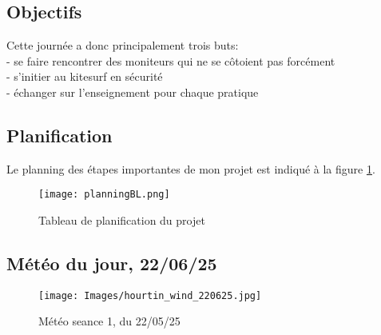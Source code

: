 \documentclass[12pt,a4paper]{report}
\begin{document}
\subsection{Objectifs}
Cette journée a donc principalement trois buts:\\
- se faire rencontrer des moniteurs qui ne se côtoient pas forcément \\
- s'initier au kitesurf en sécurité \\
- échanger sur l'enseignement pour chaque pratique \\

\subsection{Planification}
Le planning des étapes importantes de mon projet est indiqué
à la figure \ref{gantt}.

\begin{figure}
\centering
\texttt{[image: planningBL.png]} 
\caption{Tableau de planification du projet \label{gantt}}
\end{figure}
\subsection{Météo du jour, 22/06/25}
\begin{figure}
\texttt{[image: Images/hourtin\_wind\_220625.jpg]} 
\caption{Météo seance 1, du 22/05/25}
\end{figure}
\end{document}
